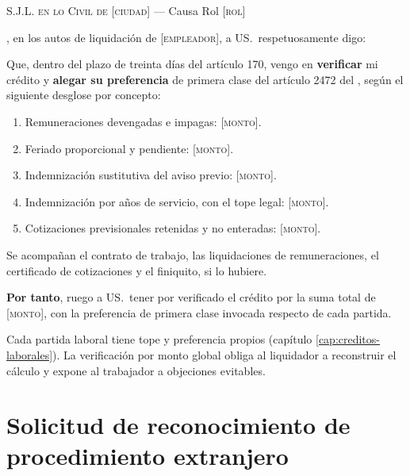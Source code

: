 \begin{escrito}
\small
\noindent\textsc{S.J.L. en lo Civil de} [\textsc{ciudad}] --- Causa Rol [\textsc{rol}]

\medskip
{}, en los autos de liquidación de [\textsc{empleador}], a
US.\ respetuosamente digo:

\medskip
Que, dentro del plazo de treinta días del artículo 170, vengo en \textbf{verificar} mi
crédito y \textbf{alegar su preferencia} de primera clase del artículo 2472 del \cc{},
según el siguiente desglose por concepto:

\begin{enumerate}[leftmargin=1.6em]
  \item Remuneraciones devengadas e impagas: [\textsc{monto}].
  \item Feriado proporcional y pendiente: [\textsc{monto}].
  \item Indemnización sustitutiva del aviso previo: [\textsc{monto}].
  \item Indemnización por años de servicio, con el tope legal: [\textsc{monto}].
  \item Cotizaciones previsionales retenidas y no enteradas: [\textsc{monto}].
\end{enumerate}

\medskip
\noindent Se acompañan el contrato de trabajo, las liquidaciones de remuneraciones, el
certificado de cotizaciones y el finiquito, si lo hubiere.

\medskip
\noindent\textbf{Por tanto}, ruego a US.\ tener por verificado el crédito por la suma total
de [\textsc{monto}], con la preferencia de primera clase invocada respecto de cada partida.
\end{escrito}

\begin{practica}
Cada partida laboral tiene tope y preferencia propios (capítulo
\ref{cap:creditos-laborales}). La verificación por monto global obliga al liquidador a
reconstruir el cálculo y expone al trabajador a objeciones evitables.
\end{practica}

\section{Solicitud de reconocimiento de procedimiento extranjero}

